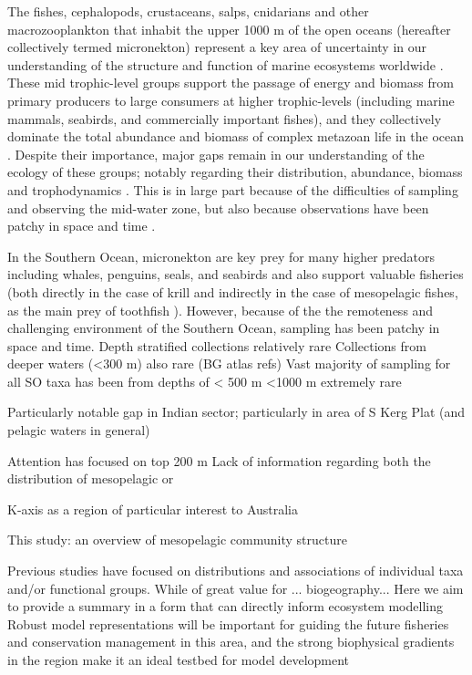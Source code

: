 \documentclass[12pt, fleqn]{article}
\begin{document}
{The fishes, cephalopods, crustaceans, salps, cnidarians and other macrozooplankton that inhabit the upper 1000 m of the open oceans (hereafter collectively termed micronekton) represent a key area of uncertainty in our understanding of the structure and function of marine ecosystems worldwide \citep{StJohn:2016cr,Young:2015}.
These mid trophic-level groups support the passage of energy and biomass from primary producers to large consumers at higher trophic-levels (including marine mammals, seabirds, and commercially important fishes), and they collectively dominate the total abundance and biomass of complex metazoan life in the ocean \cite{BarOn:2018bj,Irigoien:2014}.
Despite their importance, major gaps remain in our understanding of the ecology of these groups; notably regarding their distribution, abundance, biomass and trophodynamics \cite{Young:2015,Newman:SOOS_CWP,Davison:2015fq}. 
This is in large part because of the difficulties of sampling and observing the mid-water zone, but also because observations have been patchy in space and time \cite{Kaartvedt:2012ji,Newman:SOOS_CWP}.

In the Southern Ocean, micronekton are key prey for many higher predators including whales, penguins, seals, and seabirds \cite{Koz:1995} and also support valuable fisheries (both directly in the case of krill and indirectly in the case of mesopelagic fishes, as the main prey of toothfish \cite{Goldsworthy:2002cq,Hanchet:2015kj,Nicol:2011br}). However, because of the the remoteness and challenging environment of the Southern Ocean, sampling has been patchy in space and time. 
Depth stratified collections relatively rare
Collections from deeper waters (<300 m) also rare (BG atlas refs)
Vast majority of sampling for all SO taxa has been from depths of < 500 m \cite{Koubbi:2014SOBGAConclusion}
<1000 m extremely rare

Particularly notable gap in Indian sector; particularly in area of S Kerg Plat (and pelagic waters in general)


Attention has focused on top 200 m
Lack of information regarding both the distribution of mesopelagic or


K-axis as a region of particular interest to Australia

This study: an overview of mesopelagic community structure

Previous studies have focused on distributions and associations of individual taxa and/or functional groups. 
While of great value for ... biogeography... 
Here we aim to provide a summary in a form that can directly inform ecosystem modelling 
Robust model representations will be important for guiding the future fisheries and conservation management in this area, and the strong biophysical gradients in the region make it an ideal testbed for model development

}
\end{document}
